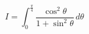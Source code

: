 \begin{displaymath}
 I=\int_{0}^{\frac{\pi}{4}}\frac{\cos^2\theta}{1+\sin^2\theta}\,d\theta
\end{displaymath}
